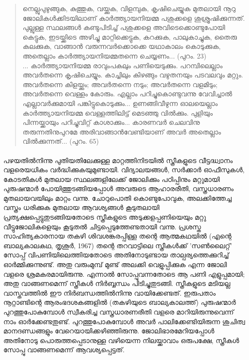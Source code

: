 \begin{quotation}
\noindent നെല്ലുപുഴുങ്ങുക, കുത്തുക, വയ്ക്കുക, വിളമ്പുക, കൃഷിചെയ്യുക മുതലായി നൂറു ജോലികൾക്കിടയിലാണ് കാർത്ത്യായനിയമ്മ പശുക്കളെ ശുശ്രൂഷിക്കുന്നത്. പുല്ലുള്ള സ്ഥലങ്ങൾ കണ്ടുപിടിച്ച് പശുക്കളെ അവിടെക്കൊണ്ടുപോയി കെട്ടുക, ഇടയ്ക്കിടെ അഴിച്ചു മാറ്റിക്കെട്ടുക, കറക്കുക, പാലുകാച്ചുക, തൈരു കലക്കുക, വാങ്ങാൻ വരുന്നവർക്കൊക്കെ യഥാകാലം കൊടുക്കുക, അതെല്ലാം കാർത്ത്യായനിയമ്മതന്നെ ചെയ്യണം... (പുറം. 23)\\

\noindent... കാർത്ത്യായനിയമ്മ രാവുംപകലും പണിയെടുക്കും. പറമ്പിലെല്ലാം അവർതന്നെ കൃഷിചെയ്യും. കാച്ചിലും കിഴങ്ങും വഴുതനയും പടവലവും മറ്റും. അവർതന്നെ കിളയ്ക്കും; അവർതന്നെ നടും; അവർതന്നെ വളമിടും; അവർതന്നെ വെള്ളം കോരും. എല്ലാം പറിച്ചുകൊണ്ടുവന്നു വേവിച്ചാൽ എല്ലാവർക്കുമായി പങ്കിട്ടുകൊടുക്കും... ഉണങ്ങിവീഴുന്ന ഓലയെല്ലാം കാർത്ത്യായനിയമ്മ വെള്ളത്തിലിട്ട് മെടഞ്ഞു വിൽക്കും. പുളിയും പിന്നയ്ക്കായും പറിച്ചുവിറ്റ് കാശാക്കും... കാരണവർ ചെലവിനു തരുന്നതിനുപുറമേ അരിവാങ്ങാൻവേണ്ടിയാണ് അവർ അതെല്ലാം വിൽക്കുന്നത്... (പുറം. 65)

\end{quotation}

\paragraph{}പഴയതിൽനിന്നു പുതിയതിലേക്കുള്ള മാറ്റത്തിനിടയിൽ സ്ത്രീകളുടെ വീട്ടദ്ധ്വാനം വളരെയധികം വർദ്ധിക്കുകയുമുണ്ടായി. വിദ്യാലയങ്ങൾ, സർക്കാർ ഓഫീസുകൾ, കോടതികൾ മുതലായ സ്ഥലങ്ങളിലേക്ക് ജോലിക്കും പഠിപ്പിനും മറ്റുമായി പുരുഷന്മാർ പോയിത്തുടങ്ങിയപ്പോൾ അവരുടെ ആഹാരരീതി, വസ്ത്രധാരണം മുതലായവയിലും മാറ്റം വന്നു. ചോറുപൊതി കൊണ്ടുപോവുക, അലക്കിത്തേച്ച വസ്ത്രം ധരിക്കുക മുതലായ ആവശ്യങ്ങൾ കൂടുതലായി പ്രത്യക്ഷപ്പെട്ടുതുടങ്ങിയതോടെ സ്ത്രീകളുടെ അടുക്കളപ്പണിയെയും മറ്റു വീട്ടുജോലികളെയും കൂടുതൽ ചിട്ടപ്പെടുത്തേണ്ടതായി വന്നു. പ്രശസ്ത സാഹിത്യകാരനായ തകഴി ശിവശങ്കരപ്പിള്ള തന്റെ ആത്മകഥയിൽ (എന്റെ ബാല്യകാലകഥ, തൃശൂർ, 1967) തന്റെ തറവാട്ടിലെ സ്ത്രീകൾക്ക് 'സൺലൈറ്റ്' സോപ്പ് വിപണിയിലെത്തിയതോടെ അതിനോടുണ്ടായ താല്പര്യത്തെക്കുറിച്ച് ഓർമ്മിക്കുന്നുണ്ട്. അതു വരുംമുമ്പ് മുണ്ട് അലക്കി വെളുപ്പിക്കുക എന്ന ജോലി വളരെ ശ്രമകരമായിരുന്നു. എന്നാൽ സോപ്പുവന്നതോടെ ആ പണി എളുപ്പമായി; അതു വാങ്ങണമെന്ന് സ്ത്രീകൾ നിർബ്ബന്ധം പിടിച്ചുതുടങ്ങി. സ്ത്രീകളുടെ മടിയല്ല വാസ്തവത്തിൽ ഈ നിർബന്ധത്തിൽനിന്നു വായിക്കേണ്ടത്. ഇരുപതാം നൂറ്റാണ്ടിന്റെ ആരംഭദശകങ്ങളിൽ (തകഴിയുടെ ബാല്യകാലത്ത്) പുരുഷന്മാർ പുറത്തുപോകുമ്പോൾ സ്വീകരിച്ച വസ്ത്രധാരണരീതി വളരെ മാറിയിരുന്നുവെന്ന് നാം ഓർക്കേണ്ടതുണ്ട്. പുറത്തുപോകുമ്പോൾ അവർ പാലിക്കേണ്ടിയിരുന്ന ശുചിത്വ മാനദണ്ഡങ്ങളും വേറെയായിക്കഴിഞ്ഞിരുന്നു. ജോലിഭാരമേറിയപ്പോൾ അതിനോടു പൊരുത്തപ്പെടാനുള്ള വഴിയെന്ന നിലയ്ക്കാവാം ഒരുപക്ഷേ, സ്ത്രീകൾ സോപ്പു വാങ്ങണമെന്ന് ആവശ്യപ്പെട്ടത്.

